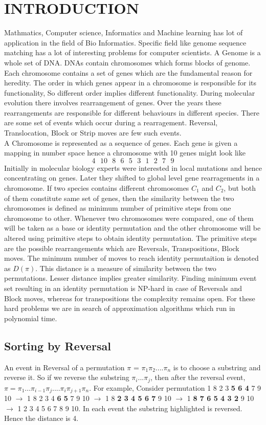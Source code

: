\documentclass[BTech]{iitmdiss}
\begin{document}
\chapter{INTRODUCTION}
\label{chap:intro}
Mathmatics, Computer science, Informatics and Machine learning has lot of application in the field of Bio Informatics. Specific field like genome sequence matching has a lot of interesting problems for computer scientists. A Genome is a whole set of DNA. DNAs contain chromosomes which forms blocks of genome. Each chromosome contains a set of genes which are the fundamental reason for heredity. The order in which genes appear in a chromosome is responsible for its functionality, So different order implies different functionality. During molecular evolution there involves rearrangement of genes. Over the years these rearrangements are responsible for different behaviours in different species. There are some set of events which occur during a rearragement. Reversal, Translocation, Block or Strip moves are few such events. \\
A Chromosome is represented as a sequence of genes. Each gene is given a mapping in number space hence a chromosome with 10 genes might look like
$$4\text{ }10\text{ }8\text{ }6\text{ }5\text{ }3\text{ }1\text{ }2\text{ }7\text{ }9$$
Initially in molecular biology experts were interested in local mutations and hence concentrating on genes. Later they shifted to global level gene rearragements in a chromosome. If two species contains different chromosomes $C_1$ and $C_2$, but both of them constitute same set of genes, then the similarity between the two chromosomes is defined as minimum number of primitive steps from one chromosome to other. Whenever two chromosomes were compared, one of them will be taken as a base or identity permutation and the other chromosome will be altered using primitive steps to obtain identity permutation. The primitive steps are the possible rearrangements which are Reversals, Transpositions, Block moves. The minimum number of moves to reach identity permutaition is denoted as $D(\pi)$. This distance is a measure of similarity between the two permutations. Lesser distance implies greater similarity. Finding minimum event set resulting in an identity permutation is NP-hard in case of Reversals and Block moves, whereas for transpositions the complexity remains open. For these hard problems we are in search of approximation algorithms which run in polynomial time. 
\section{Sorting by Reversal}
An event in Reversal of a permutation $\pi$ = $\pi_1\pi_2....\pi_n$ is to choose a substring and reverse it. So if we reverse the substring $\pi_i...\pi_j$, then after the reversal event, $\pi = \pi_1...\pi_{i-1}\pi_j....\pi_i\pi_{j+1}\pi_n$. For example, Consider permutation 1 8 2 3 \textbf{5 6 4} 7 9 10 $\rightarrow$ 1 8 2 3 4 \textbf{6 5} 7 9 10 $\rightarrow$ 1 8 \textbf{2 3 4 5 6 7} 9 10 $\rightarrow$ 1 \textbf{8 7 6 5 4 3 2} 9 10 $\rightarrow$ 1 2 3 4 5 6 7 8 9 10. In each event the substring highlighted is reversed. Hence the distance is 4. 
\end{document}
